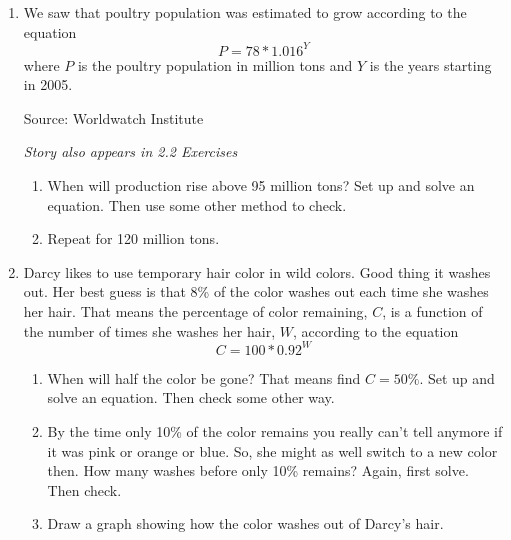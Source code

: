 \begin{enumerate}
\item We saw that poultry population was estimated to grow according to the equation $$P = 78 \ast 1.016^Y$$ where $P$ is the poultry population in million tons and $Y$ is the years starting in 2005.
\hfill \begin{footnotesize} Source:  Worldwatch Institute \end{footnotesize} 
\hfill \emph{Story also appears in 2.2 Exercises}
\begin{enumerate}
\item When will production rise above 95 million tons?  Set up and solve an equation.  Then use some other method to check.
\item Repeat for 120 million tons.
\end{enumerate}

\item Darcy likes to use temporary hair color in wild colors.  Good thing it washes out.  Her best guess is that 8\% of the color washes out each time she washes her hair.  That means the percentage of color remaining, $C$, is a function of the number of times she washes her hair, $W$, according to the equation $$C=100 \ast 0.92^W$$
\begin{enumerate}
\item When will half the color be gone?  That means find $C=50\%$.  Set up and solve an equation.  Then check some other way.
\item By the time only 10\% of the color remains you really can't tell anymore if it was pink or orange or blue.  So, she might as well switch to a new color then.  How many washes before only 10\% remains?  Again, first solve.  Then check.
\item Draw a graph showing how the color washes out of Darcy's hair.
\end{enumerate}

\end{enumerate}


